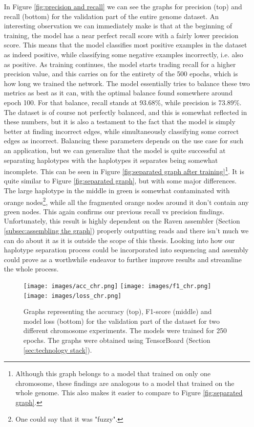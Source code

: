 \documentclass[times, utf8, diplomski, english]{fer_eng}
\begin{document}
In Figure \ref{fig:precision and recall} we can see the graphs for precision (top) and recall (bottom) for the validation part of the entire genome dataset. An interesting observation we can immediately make is that at the beginning of training, the model has a near perfect recall score with a fairly lower precision score. This means that the model classifies most positive examples in the dataset as indeed positive, while classifying some negative examples incorrectly, i.e. also as positive. As training continues, the model starts trading recall for a higher precision value, and this carries on for the entirety of the 500 epochs, which is how long we trained the network. The model essentially tries to balance these two metrics as best as it can, with the optimal balance found somewhere around epoch 100. For that balance, recall stands at 93.68\%, while precision is 73.89\%. The dataset is of course not perfectly balanced, and this is somewhat reflected in these numbers, but it is also a testament to the fact that the model is simply better at finding incorrect edges, while simultaneously classifying some correct edges as incorrect. Balancing these parameters depends on the use case for such an application, but we can generalize that the model is quite successful at separating haplotypes with the haplotypes it separates being somewhat incomplete. This can be seen in Figure \ref{fig:separated graph after training}\footnote{Although this graph belongs to a model that trained on only one chromosome, these findings are analogous to a model that trained on the whole genome. This also makes it easier to compare to Figure \ref{fig:separated graph}.}. It is quite similar to Figure \ref{fig:separated graph}, but with some major differences. The large haplotype in the middle in green is somewhat contaminated with orange nodes\footnote{One could say that it was "fuzzy".}, while all the fragmented orange nodes around it don't contain any green nodes. This again confirms our previous recall vs precision findings. Unfortunately, this result is highly dependent on the Raven assembler (Section \ref{subsec:assembling the graph}) properly outputting reads and there isn't much we can do about it as it is outside the scope of this thesis. Looking into how our haplotype separation process could be incorporated into sequencing and assembly could prove as a worthwhile endeavor to further improve results and streamline the whole process.

\begin{figure}
	\centering
	\texttt{[image: images/acc\_chr.png]}
	\texttt{[image: images/f1\_chr.png]}
	\texttt{[image: images/loss\_chr.png]}
	\caption[Accuracy,f1-score and loss graph for different chromosomes]{Graphs representing the accuracy (top), F1-score (middle) and model loss (bottom) for the validation part of the dataset for two different chromosome experiments. The models were trained for 250 epochs. The graphs were obtained using TensorBoard (Section \ref{sec:technology stack}).}
	\label{fig:accuracy, f1 score and loss chr}
\end{figure}
\end{document}
